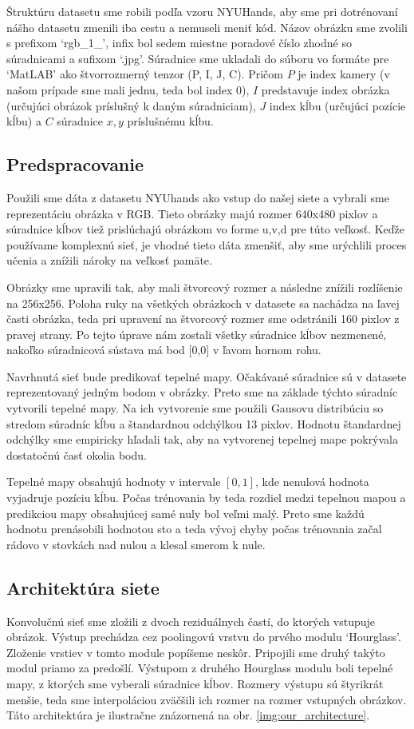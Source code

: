 Štruktúru datasetu sme robili podľa vzoru NYUHands, aby sme pri dotrénovaní nášho datasetu zmenili iba cestu a nemuseli meniť kód. Názov obrázku sme zvolili s prefixom `rgb\_1\_', infix bol sedem miestne poradové číslo zhodné so súradnicami a sufixom `.jpg'. Súradnice sme ukladali do súboru vo formáte pre `MatLAB' ako štvorrozmerný tenzor (P, I, J, C). Pričom $P$ je index kamery (v našom prípade sme mali jednu, teda bol index 0), $I$ predstavuje index obrázka (určujúci obrázok príslušný k daným súradniciam), $J$ index kĺbu (určujúci pozície kĺbu) a $C$ súradnice $x, y$ príslušnému kĺbu.

\subsection{Predspracovanie}
Použili sme dáta z datasetu NYUhands ako vstup do našej siete a vybrali sme reprezentáciu obrázka v RGB. Tieto obrázky majú rozmer 640x480 pixlov a súradnice kĺbov tiež prislúchajú obrázkom vo forme u,v,d pre túto veľkosť. Keďže používame komplexnú sieť, je vhodné tieto dáta zmenšiť, aby sme urýchlili proces učenia a znížili nároky na veľkosť pamäte. 

Obrázky sme upravili tak, aby mali štvorcový rozmer a následne znížili rozlíšenie na 256x256. Poloha ruky na všetkých obrázkoch v datasete sa nachádza na ľavej časti obrázka, teda pri upravení na štvorcový rozmer sme odstránili 160 pixlov z pravej strany. Po tejto úprave nám zostali všetky súradnice kĺbov nezmenené, nakoľko súradnicová sústava má bod [0,0] v ľavom hornom rohu.

Navrhnutá sieť bude predikovať tepelné mapy. Očakávané súradnice sú v datasete reprezentovaný jedným bodom v obrázky. Preto sme na základe týchto súradníc vytvorili tepelné mapy. Na ich vytvorenie sme použili Gausovu distribúciu so stredom súradníc kĺbu a štandardnou odchýlkou 13 pixlov. Hodnotu štandardnej odchýlky sme empiricky hľadali tak, aby na vytvorenej tepelnej mape pokrývala dostatočnú časť okolia bodu. 

Tepelné mapy obsahujú hodnoty v intervale $\left[0, 1 \right]$, kde nenulová hodnota vyjadruje pozíciu kĺbu. Počas trénovania by teda rozdiel medzi tepelnou mapou a predikciou mapy obsahujúcej samé nuly bol veľmi malý. Preto sme každú hodnotu prenásobili hodnotou sto a teda vývoj chyby počas trénovania začal rádovo v stovkách nad nulou a klesal smerom k nule. 

\subsection{Architektúra siete}
Konvolučnú sieť sme zložili z dvoch reziduálnych častí, do ktorých vstupuje obrázok. Výstup prechádza cez poolingovú vrstvu do prvého modulu `Hourglass'. Zloženie vrstiev v tomto module popíšeme neskôr. Pripojili sme druhý takýto modul priamo za predošlí. Výstupom z druhého Hourglass modulu boli tepelné mapy, z ktorých sme vyberali súradnice kĺbov. Rozmery výstupu sú štyrikrát menšie, teda sme interpoláciou zväčšili ich rozmer na rozmer vstupných obrázkov. Táto architektúra je ilustračne znázornená na obr. \ref{img:our_architecture}. 


